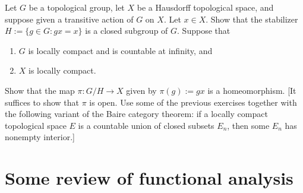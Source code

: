 \documentclass[reqno]{amsart} 
\begin{document}
\begin{exercise}\label{exercise-topological-groups-quotient-map-homeomorphism}
  Let $G$ be a topological group,
  let $X$ be a Hausdorff  topological space,
  and suppose given a transitive action of $G$ on $X$.
  Let $x \in X$.
  Show that the stabilizer $H := \{g \in G : g x = x\}$ is a closed
  subgroup of $G$.
  Suppose that
  \begin{enumerate}
  \item $G$ is locally compact and is countable at infinity, and
  \item $X$ is locally compact.
  \end{enumerate}
  Show that the map $\pi : G/H \rightarrow X$ given by
  $\pi(g) := g x$ is a homeomorphism.
  [It suffices to show that
  $\pi$ is open.
  Use some of the previous exercises
  together with the following variant of the Baire
  category theorem: if a locally compact topological space $E$
  is a countable union of closed subsets $E_n$, then some $E_n$
  has nonempty interior.]
\end{exercise}

\section{Some review of functional analysis}
\label{sec:org66cd91a}
\end{document}
